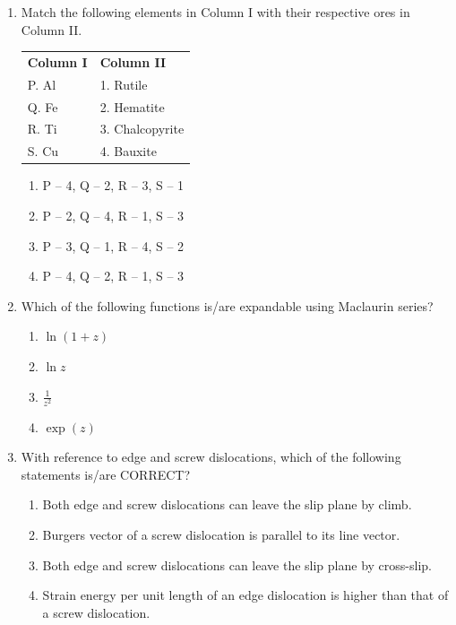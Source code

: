 \documentclass[journal]{IEEEtran}
\theoremstyle{remark}
\begin{document}
\begin{enumerate}[resume]
\item Match the following elements in Column I with their respective ores in Column II. \hfill{}
\begin{center}
\begin{tabular}{ll}
\textbf{Column I} & \textbf{Column II} \\
P. Al & 1. Rutile \\
Q. Fe & 2. Hematite \\
R. Ti & 3. Chalcopyrite \\
S. Cu & 4. Bauxite \\
\end{tabular}
\end{center}
\begin{enumerate}
\item P – 4, Q – 2, R – 3, S – 1
\item P – 2, Q – 4, R – 1, S – 3
\item P – 3, Q – 1, R – 4, S – 2
\item P – 4, Q – 2, R – 1, S – 3
\end{enumerate}

\item Which of the following functions is/are expandable using Maclaurin series? \hfill{}
\begin{multicols}{4}
\begin{enumerate}
\item $\ln(1 + z)$
\item $\ln z$
\item $\frac{1}{z^2}$
\item $\exp(z)$
\end{enumerate}
\end{multicols}

\item With reference to edge and screw dislocations, which of the following statements is/are CORRECT? \hfill{}
\begin{enumerate}
\item Both edge and screw dislocations can leave the slip plane by climb.
\item Burgers vector of a screw dislocation is parallel to its line vector.
\item Both edge and screw dislocations can leave the slip plane by cross-slip.
\item Strain energy per unit length of an edge dislocation is higher than that of a screw dislocation.
\end{enumerate}


\end{enumerate}
\end{document}

